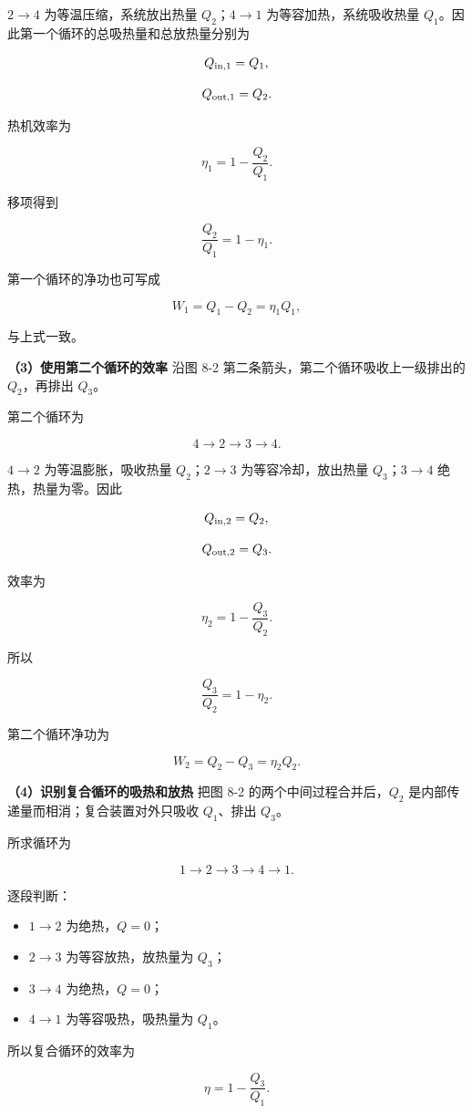 \documentclass[12pt,a4paper,UTF8]{ctexart}
\newcommand{\tightlist}{\setlength{\itemsep}{0pt}\setlength{\parskip}{0pt}}
\begin{document}
\(2\to4\) 为等温压缩，系统放出热量 \(Q_2\)；\(4\to1\)
为等容加热，系统吸收热量
\(Q_1\)。因此第一个循环的总吸热量和总放热量分别为

\[Q_{{\rm in},1}=Q_1,\]

\[Q_{{\rm out},1}=Q_2.\]

热机效率为

\[\eta_1=1-\frac{Q_2}{Q_1}.\]

移项得到

\[\boxed{\frac{Q_2}{Q_1}=1-\eta_1}.\]

第一个循环的净功也可写成

\[W_1=Q_1-Q_2=\eta_1Q_1,\]

与上式一致。

\textbf{（3）使用第二个循环的效率} 沿图 8-2
第二条箭头，第二个循环吸收上一级排出的 \(Q_2\)，再排出 \(Q_3\)。

第二个循环为

\[4\to2\to3\to4.\]

\(4\to2\) 为等温膨胀，吸收热量 \(Q_2\)；\(2\to3\) 为等容冷却，放出热量
\(Q_3\)；\(3\to4\) 绝热，热量为零。因此

\[Q_{{\rm in},2}=Q_2,\]

\[Q_{{\rm out},2}=Q_3.\]

效率为

\[\eta_2=1-\frac{Q_3}{Q_2}.\]

所以

\[\boxed{\frac{Q_3}{Q_2}=1-\eta_2}.\]

第二个循环净功为

\[W_2=Q_2-Q_3=\eta_2Q_2.\]

\textbf{（4）识别复合循环的吸热和放热} 把图 8-2
的两个中间过程合并后，\(Q_2\) 是内部传递量而相消；复合装置对外只吸收
\(Q_1\)、排出 \(Q_3\)。

所求循环为

\[1\to2\to3\to4\to1.\]

逐段判断：

\begin{itemize}
\tightlist
\item
  \(1\to2\) 为绝热，\(Q=0\)；
\item
  \(2\to3\) 为等容放热，放热量为 \(Q_3\)；
\item
  \(3\to4\) 为绝热，\(Q=0\)；
\item
  \(4\to1\) 为等容吸热，吸热量为 \(Q_1\)。
\end{itemize}

所以复合循环的效率为

\[\eta=1-\frac{Q_3}{Q_1}.\]
\end{document}
